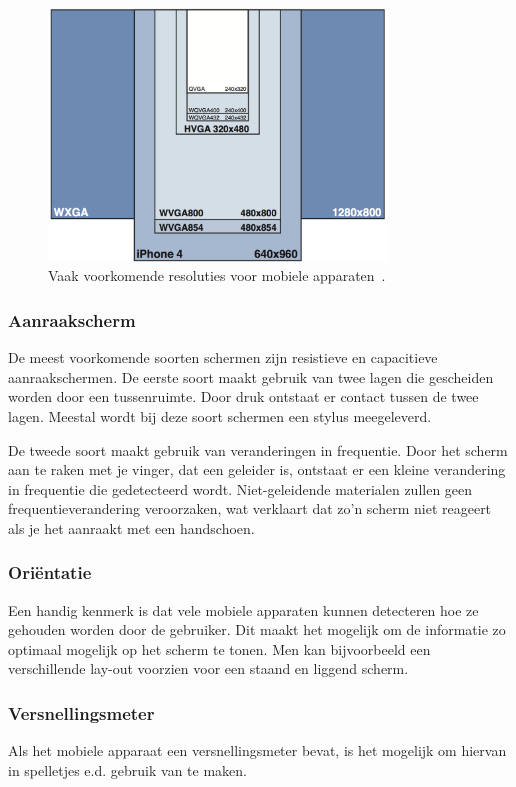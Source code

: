 \begin{figure}
  \centering
  \includegraphics[width=0.8\textwidth]{figuren/screen-resolutions.png}
  \caption{Vaak voorkomende resoluties voor mobiele apparaten~\cite{PhilDutson2012}.}
  \label{fig:resoluties}
\end{figure}

\subsubsection{Aanraakscherm}
De meest voorkomende soorten schermen zijn resistieve en capacitieve aanraakschermen. De eerste soort maakt gebruik van twee lagen die gescheiden worden door een tussenruimte. Door druk ontstaat er contact tussen de twee lagen. Meestal wordt bij deze soort schermen een stylus meegeleverd. 

De tweede soort maakt gebruik van veranderingen in frequentie. Door het scherm aan te raken met je vinger, dat een geleider is, ontstaat er een kleine verandering in frequentie die gedetecteerd wordt. Niet-geleidende materialen zullen geen frequentieverandering veroorzaken, wat verklaart dat zo'n scherm niet reageert als je het aanraakt met een handschoen.

\subsubsection{Oriëntatie}
Een handig kenmerk is dat vele mobiele apparaten kunnen detecteren hoe ze gehouden worden door de gebruiker. Dit maakt het mogelijk om de informatie zo optimaal mogelijk op het scherm te tonen. Men kan bijvoorbeeld een verschillende lay-out voorzien voor een staand en liggend scherm.

\subsubsection{Versnellingsmeter}
Als het mobiele apparaat een versnellingsmeter bevat, is het mogelijk om hiervan in spelletjes e.d. gebruik van te maken.

